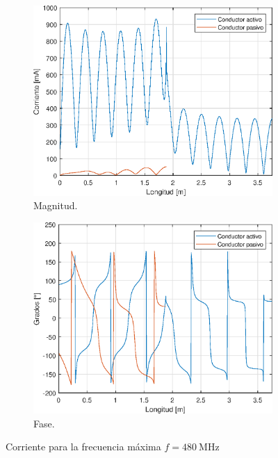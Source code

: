 \begin{figure}[H]
\begin{subfigure}{0.5\textwidth}
		\includegraphics[scale=0.6]{imagenes/i_mag_480_tierra.eps}
		\caption{Magnitud.}
	\end{subfigure}
	\quad
	\begin{subfigure}{0.5\textwidth}
		\includegraphics[scale=0.6]{imagenes/i_fase_480_tierra.eps}
		\caption{Fase.}
	\end{subfigure}
	\caption{Corriente para la frecuencia máxima $f = \SI{480}{\mega\hertz}$}
\end{figure}